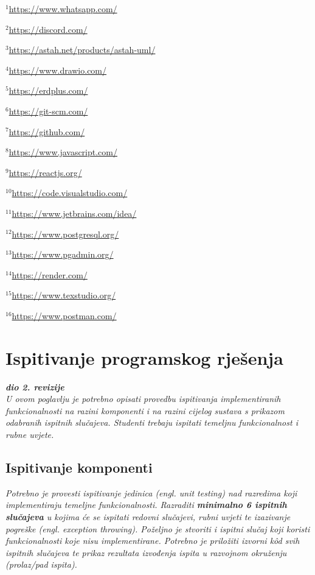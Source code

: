 			$^{1}$\url{https://www.whatsapp.com/}
			
			$^{2}$\url{https://discord.com/}
			
			$^{3}$\url{https://astah.net/products/astah-uml/}
			
			$^{4}$\url{https://www.drawio.com/}
			
			$^{5}$\url{https://erdplus.com/}
			
			$^{6}$\url{https://git-scm.com/}
			
			$^{7}$\url{https://github.com/}
			
			$^{8}$\url{https://www.javascript.com/}
			
			$^{9}$\url{https://reactjs.org/}
			
			$^{10}$\url{https://code.visualstudio.com/}
			
			$^{11}$\url{https://www.jetbrains.com/idea/}
			
			$^{12}$\url{https://www.postgresql.org/}
			
			$^{13}$\url{https://www.pgadmin.org/}
			
			$^{14}$\url{https://render.com/}
			
			$^{15}$\url{https://www.texstudio.org/}
			
			$^{16}$\url{https://www.postman.com/}
			
			\eject 
		
	
		\section{Ispitivanje programskog rješenja}
			
			\textbf{\textit{dio 2. revizije}}\\
			
			 \textit{U ovom poglavlju je potrebno opisati provedbu ispitivanja implementiranih funkcionalnosti na razini komponenti i na razini cijelog sustava s prikazom odabranih ispitnih slučajeva. Studenti trebaju ispitati temeljnu funkcionalnost i rubne uvjete.}
	
			
			\subsection{Ispitivanje komponenti}
			\textit{Potrebno je provesti ispitivanje jedinica (engl. unit testing) nad razredima koji implementiraju temeljne funkcionalnosti. Razraditi \textbf{minimalno 6 ispitnih slučajeva} u kojima će se ispitati redovni slučajevi, rubni uvjeti te izazivanje pogreške (engl. exception throwing). Poželjno je stvoriti i ispitni slučaj koji koristi funkcionalnosti koje nisu implementirane. Potrebno je priložiti izvorni kôd svih ispitnih slučajeva te prikaz rezultata izvođenja ispita u razvojnom okruženju (prolaz/pad ispita). }
			

